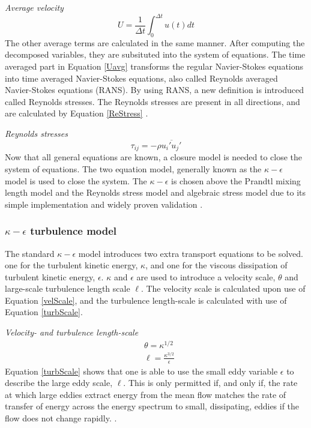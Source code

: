 \documentclass{CFD2017}
\begin{document}
\emph{Average velocity}
\begin{equation}
\label{Uavg}
U = \frac{1}{\Delta t}\int_{0}^{\Delta t}u(t)dt
\end{equation}
The other average terms are calculated in the same manner. After computing the decomposed variables, they are subsituted into the system of equations. The time averaged part in Equation \ref{Uavg} transforms the regular Navier-Stokes equations into time averaged Navier-Stokes equations, also called Reynolds averaged Navier-Stokes equations (RANS). By using RANS, a new definition is introduced called Reynolds stresses. The Reynolds stresses are present in all directions, and are calculated by Equation \ref{ReStress} \cite{slides}. \vspace{2mm}

\emph{Reynolds stresses}
\begin{equation}
\label{ReStress}
\tau_{ij}=-\rho\overline{u_i'u_j'}
\end{equation}
Now that all general equations are known, a closure model is needed to close the system of equations. The two equation model, generally known as the $\kappa-\epsilon$ model is used to close the system. The $\kappa-\epsilon$ is chosen above the Prandtl mixing length model and the Reynolds stress model and algebraic stress model due to its simple implementation and widely proven validation \cite{Versteeg2007}.


\subsubsection{$\kappa-\epsilon$ turbulence model}
The standard  $\kappa-\epsilon$ model introduces two extra transport equations to be solved. one for the turbulent kinetic energy, $\kappa$, and one for the viscous dissipation of turbulent kinetic energy, $\epsilon$.  $\kappa$ and $\epsilon$ are used to introduce a velocity scale, $\theta$ and large-scale turbulence length scale $\ell$. The velocity scale is calculated upon use of Equation \ref{velScale}, and the turbulence length-scale is calculated with use of Equation \ref{turbScale}.\vspace{2mm}

\emph{Velocity- and turbulence length-scale}
\begin{align}
&\theta = \kappa^{1/2} \label{velScale}\\
&\ell=\frac{\kappa^{3/2}}{\epsilon} \label{turbScale}
\end{align}
Equation \ref{turbScale} shows that one is able to use the small eddy variable $\epsilon$ to describe the large eddy scale, $\ell$. This is only permitted if, and only if, the rate at which large eddies extract energy from the mean flow matches the rate of transfer of energy across the energy spectrum to small, dissipating, eddies if the flow does not change rapidly. \cite{Versteeg2007}.\\
\end{document}
